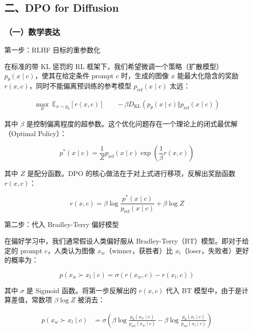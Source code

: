 \hypertarget{ux4e8cdpo-for-diffusion}{%
\subsection{二、DPO for Diffusion}\label{ux4e8cdpo-for-diffusion}}

\hypertarget{ux4e00ux6570ux5b66ux8868ux8fbe}{%
\subsubsection{（一）数学表达}\label{ux4e00ux6570ux5b66ux8868ux8fbe}}

第一步：RLHF 目标的重参数化

在标准的带 KL 惩罚的 RL 框架下，我们希望微调一个策略（扩散模型）\(p_\theta(x\mid c)\)，使其在给定条件 prompt \(c\) 时，生成的图像 \(x\) 能最大化隐含的奖励 \(r(x,c)\)，同时不能偏离预训练的参考模型 \(p_{\mathrm{ref}}(x\mid c)\) 太远：

\[
\begin{aligned}
\max_\theta\ \mathbb{E}_{x\sim p_\theta}\left[r(x,c)\right]
&\quad-\beta D_{\mathrm{KL}}\left(p_\theta(x\mid c)\Vert p_{\mathrm{ref}}(x\mid c)\right)
\end{aligned}
\]

其中 \(\beta\) 是控制偏离程度的超参数。这个优化问题存在一个理论上的闭式最优解（Optimal Policy）：

\[
p^{*}(x\mid c)=\frac{1}{Z}p_{\mathrm{ref}}(x\mid c)\exp\left(\frac{1}{\beta}r(x,c)\right)
\]

其中 \(Z\) 是配分函数。DPO 的核心做法在于对上式进行移项，反解出奖励函数 \(r(x,c)\)：

\[
r(x,c)=\beta\log\frac{p^{*}(x\mid c)}{p_{\mathrm{ref}}(x\mid c)}+\beta\log Z
\]

第二步：代入 Bradley-Terry 偏好模型

在偏好学习中，我们通常假设人类偏好服从 Bradley-Terry（BT）模型。即对于给定的 prompt \(c\)，人类认为图像 \(x_w\)（winner，获胜者）比 \(x_l\)（loser，失败者）更好的概率为：

\[
p(x_w\succ x_l\mid c)=\sigma\left(r(x_w,c)-r(x_l,c)\right)
\]

其中 \(\sigma\) 是 Sigmoid 函数。将第一步反解出的 \(r(x,c)\) 代入 BT 模型中，由于是计算差值，常数项 \(\beta\log Z\) 被消去：

\[
\begin{aligned}
p(x_w\succ x_l\mid c)
&=\sigma\left(
\beta\log\frac{p_\theta(x_w\mid c)}{p_{\mathrm{ref}}(x_w\mid c)}
-\beta\log\frac{p_\theta(x_l\mid c)}{p_{\mathrm{ref}}(x_l\mid c)}
\right)
\end{aligned}
\]

